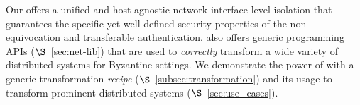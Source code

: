 


Our \projecttitle{} offers a unified and host-agnostic network-interface level isolation that guarantees the specific yet well-defined security properties of the non-equivocation and transferable authentication. 
\projecttitle{} also offers generic programming APIs ($\S$~\ref{sec:net-lib}) that are used to {\em correctly} transform a wide variety of distributed systems for Byzantine settings. 
We demonstrate the power of \projecttitle{} with a generic transformation {\em recipe} ($\S$~\ref{subsec:transformation}) and its usage to transform prominent distributed systems ($\S$~\ref{sec:use_cases}).

